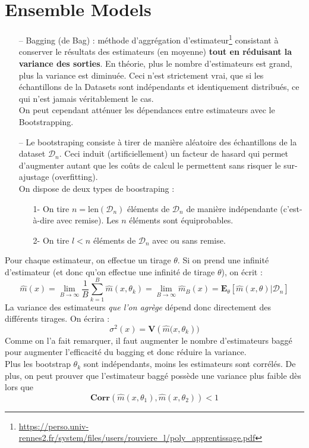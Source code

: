 \documentclass[a4paper,12pt]{report}
\newcommand{\bepar}[1]{
	\left( #1 \right)  
}
\newcommand{\becro}[1]{
	\left[ #1 \right]  
}
\newcommand\bk{\color{black}}
\newcommand\navy{\color{navy}}
\newcommand{\cad}{c'est-à-dire}
\numberwithin{equation}{section} %
\begin{document}
\navy \chapter{Ensemble Models} \bk 
\begin{itemize}
\item[--] Bagging (de Bag) : méthode d'aggrégation d'estimateur\footnote{\url{https://perso.univ-rennes2.fr/system/files/users/rouviere_l/poly_apprentissage.pdf}} consistant à conserver le résultats des estimateurs (en moyenne) \textbf{tout en réduisant la variance des sorties}. En théorie, plus le nombre d'estimateurs est grand, plus la variance est diminuée. Ceci n'est strictement vrai, que si les échantillons de la Datasets sont indépendants et identiquement distribués, ce qui n'est jamais véritablement le cas.\\
On peut cependant atténuer les dépendances entre estimateurs avec le Bootstrapping.\\

\item[--] Le bootstraping consiste à tirer de manière aléatoire des échantillons de la dataset $\mathcal{D}_n$. Ceci induit (artificiellement) un facteur de hasard qui permet d'augmenter autant que les coûts de calcul le permettent sans risquer le sur-ajustage (overfitting). \\ On dispose de deux types de boostraping : 
\begin{itemize}
\item[1-] On tire $n = \text{len}\bepar{\mathcal{D}_n}$ éléments de $\mathcal{D}_n$ de manière indépendante (\cad $ $ avec remise). Les $n$ éléments sont équiprobables.
\item[2-] On tire $l < n$ éléments de $\mathcal{D}_n$ avec ou sans remise. 
\end{itemize}
\end{itemize}

\noindent Pour chaque estimateur, on effectue un tirage $\theta$. Si on prend une infinité d'estimateur (et donc qu'on effectue une infinité de tirage $\theta$), on écrit :
\begin{equation*}
\hat{m}(x) = \lim_{B \rightarrow \infty}{\frac{1}{B} \sum^B_{k=1} \hat{m}(x, \theta_k)} =  \lim_{B \rightarrow \infty} \hat{m}_B(x) = \textbf{E}_\theta\becro{\hat{m}(x,\theta)\vert\mathcal{D}_n}
\end{equation*}  
La variance des estimateurs \textit{que l'on agrège} dépend donc directement des différents tirages. On écrira :
\begin{equation*}
\sigma^2(x) = \textbf{V}\bepar{\hat{m}(x, \theta_k})
\end{equation*}
Comme on l'a fait remarquer, il faut augmenter le nombre d'estimateurs baggé pour augmenter l'efficacité du bagging et donc réduire la variance. \\
Plus les bootstrap $\theta_k$ sont indépendants, moins les estimateurs sont corrélés. De plus, on peut prouver que l'estimateur baggé possède une variance plus faible dès lors que $$ \textbf{Corr}\bepar{\hat{m}(x, \theta_1), \hat{m}(x, \theta_2)} <1$$ 
\end{document}
